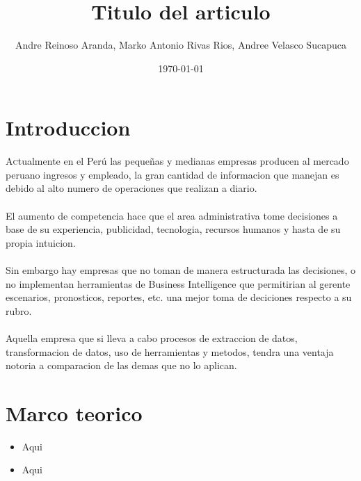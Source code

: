 \documentclass[twoside,twocolumn]{article}
\title{Titulo del articulo}
\author{Andre Reinoso Aranda, Marko Antonio Rivas Rios, Andree Velasco Sucapuca }
\date{\today}
\begin{document}
\maketitle


\section{Introduccion}
\lettrine[nindent=0em,lines=3]{A}ctualmente en el Perú las pequeñas y medianas empresas producen al mercado peruano ingresos y empleado, la gran cantidad de informacion que manejan es debido al alto numero de operaciones que realizan a diario.\\ \\
El aumento de competencia hace que el area administrativa tome decisiones a base de su experiencia, publicidad, tecnologia, recursos humanos y hasta de su propia intuicion.\\ \\
Sin embargo hay empresas que no toman de manera estructurada las decisiones, o no implementan herramientas de Business Intelligence que permitirian al gerente escenarios, pronosticos, reportes, etc. una mejor toma de deciciones respecto a su rubro. \\ \\
Aquella empresa que si lleva a cabo procesos de extraccion de datos, transformacion de datos, uso de herramientas y metodos, tendra una ventaja notoria a comparacion de las demas que no lo aplican.



\section{Marco teorico}

\begin{itemize}
\item Aqui
\item Aqui

\end{itemize}
\end{document}
